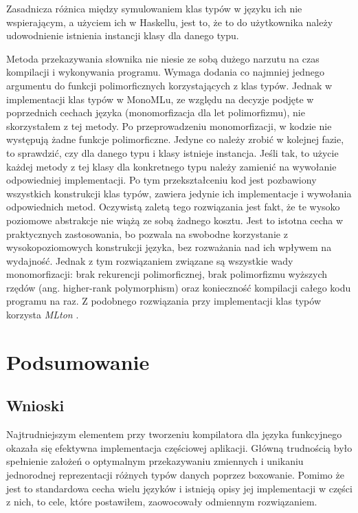 \documentclass[declaration,shortabstract]{iithesis}
\begin{document}

Zasadnicza różnica między symulowaniem klas typów w języku ich nie 
wspierającym, a użyciem ich w Haskellu, jest to, że to do użytkownika należy 
udowodnienie istnienia instancji klasy dla danego typu.

Metoda przekazywania słownika nie niesie ze sobą dużego narzutu na czas 
kompilacji i wykonywania programu. Wymaga dodania co najmniej
jednego argumentu do funkcji polimorficznych korzystających z klas typów. 
Jednak w implementacji klas typów w MonoMLu, ze względu na decyzje 
podjęte w poprzednich cechach języka (monomorfizacja dla let polimorfizmu), 
nie skorzystałem z tej metody. Po przeprowadzeniu monomorfizacji, w kodzie nie 
występują żadne funkcje polimorficzne. Jedyne co należy zrobić w kolejnej 
fazie, to sprawdzić, czy dla danego typu i klasy istnieje instancja. Jeśli tak,
to użycie każdej metody z tej klasy dla konkretnego typu należy zamienić 
na wywołanie odpowiedniej implementacji. Po tym przekształceniu kod jest 
pozbawiony wszystkich konstrukcji klas typów, zawiera jedynie ich 
implementacje i wywołania odpowiednich metod. Oczywistą zaletą tego rozwiązania
jest fakt, że te wysoko poziomowe abstrakcje nie wiążą ze sobą żadnego kosztu.
Jest to istotna cecha w praktycznych zastosowania, bo pozwala na swobodne 
korzystanie z wysokopoziomowych konstrukcji języka, bez rozważania nad ich 
wpływem na wydajność. Jednak z tym rozwiązaniem związane są wszystkie wady 
monomorfizacji: brak rekurencji polimorficznej, brak polimorfizmu wyższych 
rzędów (ang. higher-rank polymorphism) oraz konieczność kompilacji całego kodu 
programu na raz. Z podobnego rozwiązania przy implementacji klas typów 
korzysta \textit{MLton} \cite{okmij}.



\chapter{Podsumowanie}

\section{Wnioski}
Najtrudniejszym elementem przy tworzeniu kompilatora dla języka funkcyjnego 
okazała się efektywna implementacja częściowej aplikacji. Główną trudnością
było spełnienie założeń o optymalnym przekazywaniu zmiennych i unikaniu 
jednorodnej reprezentacji różnych typów danych poprzez boxowanie. Pomimo że 
jest to standardowa cecha wielu języków i istnieją opisy jej implementacji
w części z nich, to cele, które postawiłem, zaowocowały odmiennym rozwiązaniem.
\end{document}
